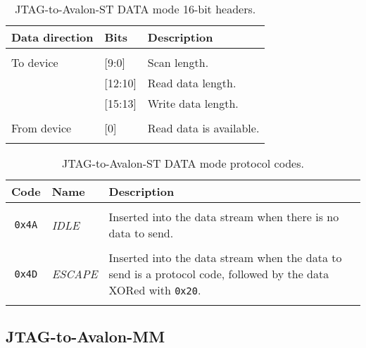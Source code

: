 \documentclass[10pt,twoside]{article}
\begin{document}
%
\begin{table}[p]
\caption{JTAG-to-Avalon-ST DATA mode 16-bit headers.}
\label{tab:jtag_to_avalon_st_headers}
\begin{center}
\begin{tabular}{|l|l|p{9.5cm}|}
\hline
Data direction & Bits & Description\\
\hline\hline
&&\\
To device & [9:0]   & Scan length.\\
          & [12:10] & Read data length.\\
          & [15:13] & Write data length.\\
&&\\
From device & [0] & Read data is available.\\
&&\\
\hline
\end{tabular}
\end{center}
\end{table}

%
\begin{table}[p]
\caption{JTAG-to-Avalon-ST DATA mode protocol codes.}
\label{tab:jtag_to_avalon_st_protocol_codes}
\begin{center}
\begin{tabular}{|c|l|p{10.5cm}|}
\hline
Code & Name & Description\\
\hline\hline
&&\\
\verb+0x4A+ & {\em IDLE}   & Inserted into the data stream when there is no data to send.\\
&&\\
\verb+0x4D+ & {\em ESCAPE} & Inserted into the data stream when the data to send is a protocol
               code, followed by the data XORed with \verb+0x20+.\\
&&\\
\hline
\end{tabular}
\end{center}
\end{table}

\clearpage
\subsection{JTAG-to-Avalon-MM}
\label{sec:jtag_to_avalon_mm}
\end{document}
